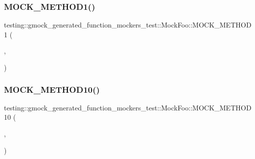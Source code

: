 \subsubsection{\texorpdfstring{MOCK\_METHOD1()}{MOCK\_METHOD1()}\hspace{0.1cm}{\footnotesize\ttfamily [32/32]}}
{\footnotesize\ttfamily testing\+::gmock\+\_\+generated\+\_\+function\+\_\+mockers\+\_\+test\+::\+Mock\+Foo\+::\+M\+O\+C\+K\+\_\+\+M\+E\+T\+H\+O\+D1 (\begin{DoxyParamCaption}\item[{\mbox{\hyperlink{classtesting_1_1gmock__generated__function__mockers__test_1_1_foo_interface_ac3f47b680d4a46f2a77ebd76b7243187}{Type\+With\+Templated\+Copy\+Ctor}}}]{,  }\item[{int(const \mbox{\hyperlink{classtesting_1_1gmock__generated__function__mockers__test_1_1_templated_copyable}{Templated\+Copyable}}$<$ int $>$ \&)}]{ }\end{DoxyParamCaption})}

\mbox{\label{classtesting_1_1gmock__generated__function__mockers__test_1_1_mock_foo_ab0a37a844eb43c36ca45cff5274bd9e9}} 
\subsubsection{\texorpdfstring{MOCK\_METHOD10()}{MOCK\_METHOD10()}\hspace{0.1cm}{\footnotesize\ttfamily [1/3]}}
{\footnotesize\ttfamily testing\+::gmock\+\_\+generated\+\_\+function\+\_\+mockers\+\_\+test\+::\+Mock\+Foo\+::\+M\+O\+C\+K\+\_\+\+M\+E\+T\+H\+O\+D10 (\begin{DoxyParamCaption}\item[{\mbox{\hyperlink{classtesting_1_1gmock__generated__function__mockers__test_1_1_foo_interface_a5a389017205848c7b7055c071cca0c6d}{Decimal}}}]{,  }\item[{int(bool, char, short, int, long, float, double, unsigned, char $\ast$, const std\+::string \&str)}]{ }\end{DoxyParamCaption})}

\mbox{\label{classtesting_1_1gmock__generated__function__mockers__test_1_1_mock_foo_ab0a37a844eb43c36ca45cff5274bd9e9}} 
